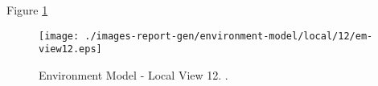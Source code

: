 
Figure \ref{fig:lu.uni.lassy.excalibur.examples.icrash-EM-view-local-12} 


\begin{figure}[htbp] 
\label{fig:lu.uni.lassy.excalibur.examples.icrash-EM}
\begin{center}
\texttt{[image: ./images-report-gen/environment-model/local/12/em-view12.eps]}
\end{center}
\caption[Environment Model - Local View 12 - ]{Environment Model - Local View 12. .}
\label{fig:lu.uni.lassy.excalibur.examples.icrash-EM-view-local-12}
\end{figure}
\vspace{0.5cm} 
